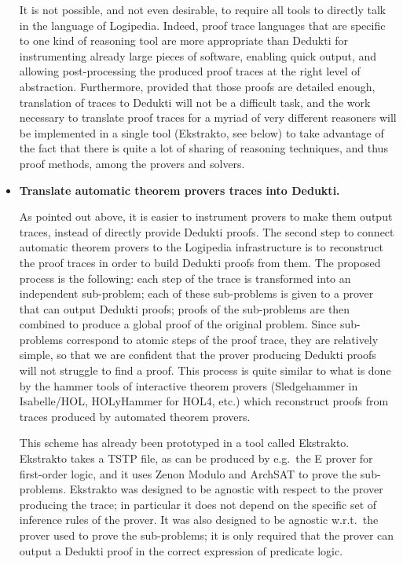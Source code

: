 \begin{itemize}
It is not possible, and not even desirable, to require all tools to
directly talk in the language of Logipedia.  Indeed, proof trace
languages that are specific to one kind of reasoning tool are more
appropriate than Dedukti for instrumenting already large pieces of
software, enabling quick output, and allowing post-processing the
produced proof traces at the right level of abstraction.
Furthermore, provided that those proofs are detailed enough,
translation of traces to Dedukti will not be a difficult task, and
the work necessary to translate proof traces for a myriad of very
different reasoners will be implemented in a single tool (Ekstrakto,
see below) to take advantage of the fact that there is quite a lot of
sharing of reasoning techniques, and thus proof methods, among the
provers and solvers.

\item{\bf Translate automatic theorem provers traces into Dedukti.}
  
As pointed out above, it is easier to instrument provers to make them
output traces, instead of directly provide Dedukti proofs. The second
step to connect automatic theorem provers to the Logipedia
infrastructure is to reconstruct the proof traces in order to build
Dedukti proofs from them. The proposed process is the following: each
step of the trace is transformed into an independent sub-problem; each
of these sub-problems is given to a prover that can output Dedukti
proofs; proofs of the sub-problems are then combined to produce a
global proof of the original problem.  Since sub-problems correspond
to atomic steps of the proof trace, they are relatively simple, so
that we are confident that the prover producing Dedukti proofs will
not struggle to find a proof. This process is quite similar to what is
done by the hammer tools of interactive theorem provers (Sledgehammer
in Isabelle/HOL, HOLyHammer for HOL4, etc.) which reconstruct proofs
from traces produced by automated theorem provers.

This scheme has already been prototyped in a tool called
Ekstrakto. Ekstrakto takes a TSTP file, as can be produced by
e.g.\ the E prover for first-order logic, and it uses Zenon Modulo and
ArchSAT to prove the sub-problems. Ekstrakto was designed to be
agnostic with respect to the prover producing the trace; in particular
it does not depend on the specific set of inference rules of the
prover. It was also designed to be agnostic w.r.t.\ the prover used to
prove the sub-problems; it is only required that the prover can output
a Dedukti proof in the correct expression of predicate logic.


\end{itemize}
